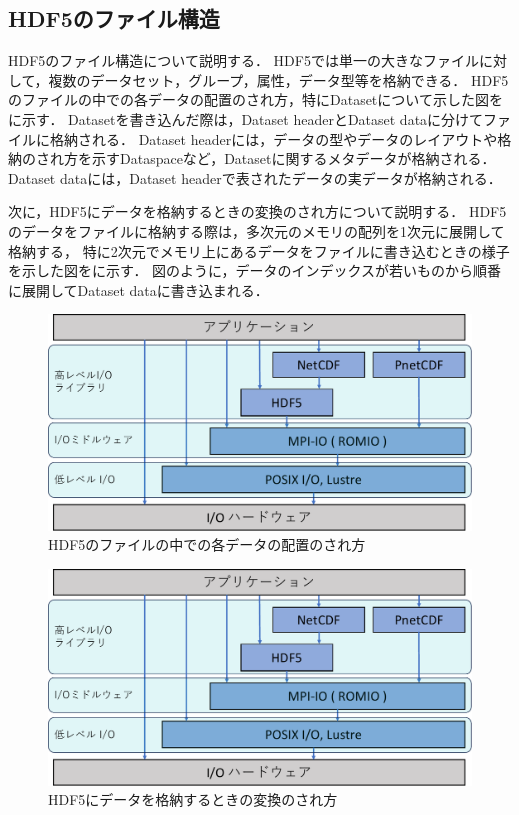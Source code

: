 \documentclass[submit,techrep,noauthor]{ipsj}
\begin{document}
\subsection{HDF5のファイル構造}
HDF5のファイル構造について説明する．
HDF5では単一の大きなファイルに対して，複数のデータセット，グループ，属性，データ型等を格納できる．
HDF5のファイルの中での各データの配置のされ方，特にDatasetについて示した図をに示す．
Datasetを書き込んだ際は，Dataset headerとDataset dataに分けてファイルに格納される．
Dataset headerには，データの型やデータのレイアウトや格納のされ方を示すDataspaceなど，Datasetに関するメタデータが格納される．
Dataset dataには，Dataset headerで表されたデータの実データが格納される．

次に，HDF5にデータを格納するときの変換のされ方について説明する．
HDF5のデータをファイルに格納する際は，多次元のメモリの配列を1次元に展開して格納する，
特に2次元でメモリ上にあるデータをファイルに書き込むときの様子を示した図をに示す．
図のように，データのインデックスが若いものから順番に展開してDataset dataに書き込まれる．

\begin{figure}[t]
	\centering
	\includegraphics[page=13,width=\linewidth]{figure-crop.pdf}
	\caption{HDF5のファイルの中での各データの配置のされ方}
	\label{fig:hdf5file}
\end{figure}

\begin{figure}[t]
	\centering
	\includegraphics[page=17,width=\linewidth]{figure-crop.pdf}
	\caption{HDF5にデータを格納するときの変換のされ方}
	\label{fig:hdf5mem2file}
\end{figure}
\end{document}
